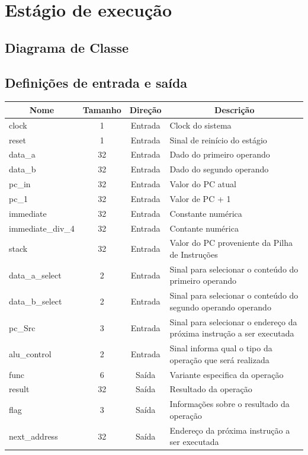 \section{Estágio de execução}
	\subsection{Diagrama de Classe}
  \begin{figure}[h]
    
  \end{figure}
		
		\subsection{Definições de entrada e saída}
		
	\begin{center}
		\begin{longtable}[pos]{| l | c | c | m{7cm} |} \hline
			\multicolumn{1}{|c|}{\cellcolor[gray]{0.9}\textbf{Nome}} & 
			\multicolumn{1}{c|}{\cellcolor[gray]{0.9}\textbf{Tamanho}} & 
			\multicolumn{1}{c|}{\cellcolor[gray]{0.9}\textbf{Direção}} &
			\multicolumn{1}{c|}{\cellcolor[gray]{0.9}\textbf{Descrição}} \\ \hline
			\endhead
			\hline
			\endlastfoot

			clock & 1 & Entrada & Clock do sistema \\ \hline
			reset & 1 & Entrada & Sinal de reinício do estágio\\ \hline
			data\_a & 32 & Entrada & Dado do primeiro operando \\ \hline
			data\_b & 32 & Entrada & Dado do segundo operando \\ \hline
			pc\_in & 32 & Entrada & Valor do PC atual \\ \hline
			pc\_1 & 32 & Entrada & Valor de PC + 1\\ \hline
			immediate & 32 & Entrada & Constante numérica  \\ \hline
			immediate\_div\_4 & 32 & Entrada & Contante numérica \\\hline
			stack & 32 & Entrada & Valor do PC proveniente da Pilha de Instruções \\\hline
			data\_a\_select & 2 & Entrada & Sinal para selecionar o conteúdo do primeiro operando \\\hline
			data\_b\_select & 2 & Entrada & Sinal para selecionar o conteúdo do segundo operando operando \\\hline
			pc\_Src & 3 & Entrada & Sinal para selecionar o endereço da próxima instrução a ser executada \\\hline
			alu\_control & 2 & Entrada & Sinal informa qual o tipo da operação que será realizada\\\hline
			func & 6 & Saída & Variante especifica da operação \\\hline
			result & 32 & Saída & Resultado da operação \\\hline
			flag & 3 & Saída & Informações sobre o resultado da operação \\\hline
			next\_address & 32 & Saída & Endereço da próxima instrução a ser executada\\\hline
			

\end{longtable}
\end{center}
